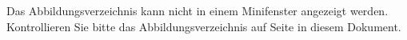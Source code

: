 
Das Abbildungsverzeichnis kann nicht in einem Minifenster angezeigt werden. Kontrollieren Sie bitte das Abbildungsverzeichnis auf Seite \pageref{abbildungen} in diesem Dokument.
